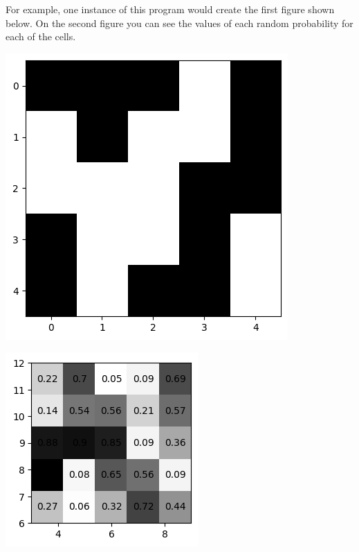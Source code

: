 \documentclass[compress]{beamer}
\begin{document}
\begin{frame}
    For example, one instance of this program would create the first figure shown below.
    On the second figure you can see the values of each random probability for each of the
    cells.

    \vspace{12pt}

    \begin{minipage}{.5\linewidth}
        \begin{center}
            \includegraphics[width=.7\linewidth]{random_array_true-false.png}
        \end{center}
    \end{minipage}\hfill%
    \begin{minipage}{.5\linewidth}
        \begin{center}
            \includegraphics[width=.74\linewidth]{random_array.png}
        \end{center}
    \end{minipage}
\end{frame}
\end{document}
